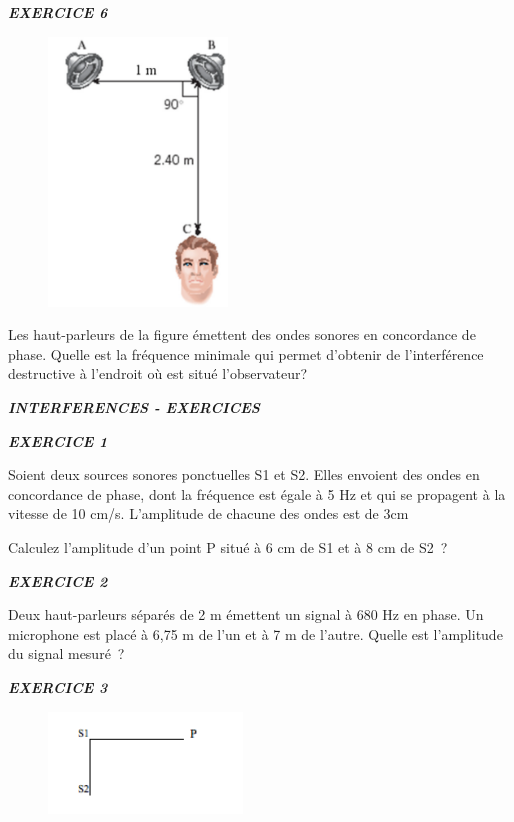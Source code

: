 {\emph{\textbf{EXERCICE 6}}

\begin{figure}
\centering
\includegraphics[width=4.757cm,height=7.147cm]{Pictures/10000001000001BA00000298E2F6E319C348E061.png}
\caption{}
\end{figure}

Les haut-parleurs de la figure émettent des ondes sonores en concordance
de phase. Quelle est la fréquence minimale qui permet d'obtenir de
l'interférence destructive à l'endroit où est situé l'observateur?

\emph{\textbf{INTERFERENCES - EXERCICES}}

\emph{\textbf{EXERCICE 1}}

Soient deux sources sonores ponctuelles S1 et S2. Elles envoient des
ondes en concordance de phase, dont la fréquence est égale à 5 Hz et qui
se propagent à la vitesse de 10 cm/s. L'amplitude de chacune des ondes
est de 3cm

Calculez l'amplitude d'un point P situé à 6 cm de S1 et à 8 cm de S2~?

\emph{\textbf{EXERCICE 2}}

Deux haut-parleurs séparés de 2 m émettent un signal à 680 Hz en phase.
Un microphone est placé à 6,75 m de l'un et à 7 m de l'autre. Quelle est
l'amplitude du signal mesuré~?

\emph{\textbf{EXERCICE 3}}

\begin{figure}
\centering
\includegraphics[width=5.151cm,height=2.729cm]{Pictures/10000001000000BC000000630AF71C86AA2A0A65.png}
\caption{}
\end{figure}

}
